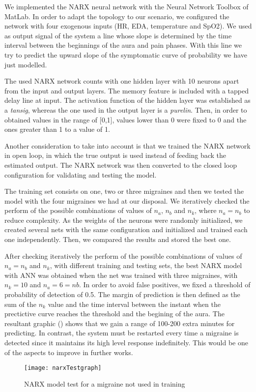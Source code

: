 \label{sec:application:NARX}

We implemented the NARX neural network with the Neural Network 
Toolbox of MatLab. In order to adapt the topology to our scenario, 
we configured the network with four exogenous inputs (HR, EDA, 
temperature and SpO2). We used as output signal of the system a line 
whose slope is determined by the time interval between the 
beginnings of the aura and pain phases. With this line we try to 
predict the upward slope of the symptomatic curve of probability we 
have just modelled. 

The used NARX network counts with one hidden layer with 10 
neurons apart from the input and output layers. 
The memory feature is included with a tapped delay line at input. 
The activation function of the hidden layer was established as 
a \textit{tansig}, whereas the one used in the output layer is 
a \textit{purelin}. Then, in order to obtained values in the range of [0,1], values lower than 0 were fixed to 0 and the ones greater than 1 to a value of 1.

Another consideration to take into account is that we trained the 
NARX network in open loop, in which the true output is used instead 
of feeding back the estimated output. The NARX network was then 
converted to the closed loop configuration for validating and 
testing the model.

The training set consists on one, two or three migraines and then we tested the model with the four migraines we had at our disposal. 
We iteratively checked the perform  
of the possible combinations of values of 
$n_{a}$, $n_{b}$ and $n_{k}$, where $n_{a} = n_{b}$ to reduce
complexity. As the weights of the neurons were randomly initialized,
we created several nets with the same configuration and initialized
and trained each one independently. Then, we compared the results
and stored the best one.

After checking iteratively the perform  
of the possible combinations of values of 
$n_{a}=n_{b}$ and $n_{k}$, with different training and testing
sets, the best NARX model with ANN was obtained when the net was 
trained with three migraines, with $n_{k}=10$ and $n_{a}=6=n{b}$.
In order to avoid false positives, we fixed a threshold 
of probability of detection of 0.5. The margin of prediction is then 
defined as the sum of the $n_{k}$ value and the time interval 
between the instant when the prectictive curve reaches the threshold 
and the begining of the aura. The resultant graphic 
()
shows that we gain a range of 100-200 extra
minutes for predicting. In contrast, the system must be restarted
every time a migraine is detected since it maintains its high level 
response indefinitely. This would be one of the aspects to improve 
in further works.

\begin{figure}
\centering
\texttt{[image: narxTestgraph]}
\caption{NARX model test for a migraine not used in training}
\label{fig:narxTest}
\end{figure}
